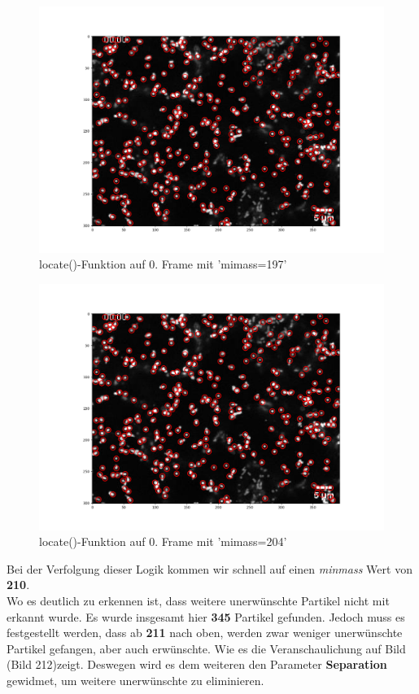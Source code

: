 \begin{enumerate}
\begin{figure}[H]
    \centering
    \includegraphics[scale=0.35]{Grafiken/trackpyBilder/locate_with_minmass_02.png}
    \caption{locate()-Funktion auf 0. Frame mit 'mimass=197'}
    \label{fig:kap3_m=197}
\end{figure}


\begin{figure}[H]
    \centering
    \includegraphics[scale=0.35]{Grafiken/trackpyBilder/locate_with_minmass_04(204).png}
    \caption{locate()-Funktion auf 0. Frame mit 'mimass=204'}
    \label{fig:kap3_m=204}
\end{figure}

Bei der Verfolgung dieser Logik kommen wir schnell auf einen \textit{minmass} Wert von \textbf{210}.\\
Wo es deutlich zu erkennen ist, dass weitere unerwünschte Partikel nicht mit erkannt wurde. Es wurde insgesamt hier \textbf{345} Partikel gefunden. Jedoch muss es festgestellt werden, dass ab \textbf{211} nach oben, werden zwar weniger unerwünschte Partikel gefangen, aber auch erwünschte. 
Wie es die Veranschaulichung auf Bild (Bild 212)zeigt. 
Deswegen wird es dem weiteren  den Parameter  \textbf{Separation} gewidmet, um weitere unerwünschte zu eliminieren.


\end{enumerate}
